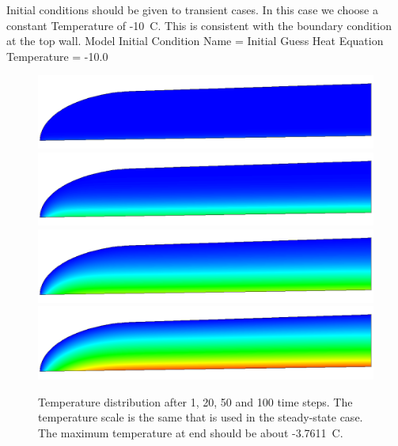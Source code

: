Initial conditions should be given to transient cases. In this case we choose a constant Temperature 
of -10~C. This is consistent with the boundary condition at the top wall.
\ttbegin
Model
  Initial Condition 
    Name = Initial Guess
    Heat Equation
      Temperature = -10.0
\ttend

\begin{figure}
\begin{center}
\includegraphics[width=120mm]{glacier_t1}
\includegraphics[width=120mm]{glacier_t20}
\includegraphics[width=120mm]{glacier_t50}
\includegraphics[width=120mm]{glacier_t100}
\caption{Temperature distribution after 1, 20, 50 and 100 time steps. The temperature scale is the 
same that is used in the steady-state case. The maximum temperature at end should be about -3.7611~C.}
\end{center}
\end{figure}

\hfill
\mbox{}






